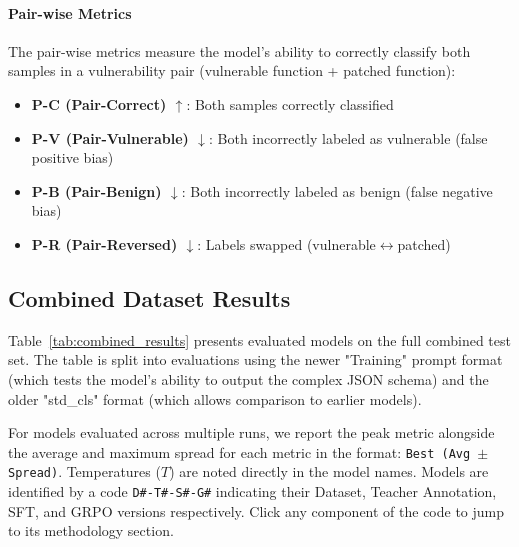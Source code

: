 \documentclass[12pt,a4paper]{article}
\begin{document}
\paragraph{Pair-wise Metrics}
The pair-wise metrics measure the model's ability to correctly classify both samples in a vulnerability pair (vulnerable function + patched function):
\begin{itemize}
  \item \textbf{P-C (Pair-Correct) $\uparrow$}: Both samples correctly classified
  \item \textbf{P-V (Pair-Vulnerable) $\downarrow$}: Both incorrectly labeled as vulnerable (false positive bias)
  \item \textbf{P-B (Pair-Benign) $\downarrow$}: Both incorrectly labeled as benign (false negative bias)
  \item \textbf{P-R (Pair-Reversed) $\downarrow$}: Labels swapped (vulnerable$\leftrightarrow$patched)
\end{itemize}

\subsection{Combined Dataset Results}

Table~\ref{tab:combined_results} presents evaluated models on the full combined test set. The table is split into evaluations using the newer "Training" prompt format (which tests the model's ability to output the complex JSON schema) and the older "std\_cls" format (which allows comparison to earlier models). 

For models evaluated across multiple runs, we report the peak metric alongside the average and maximum spread for each metric in the format: \texttt{Best (Avg $\pm$ Spread)}. Temperatures ($T$) are noted directly in the model names. Models are identified by a code \texttt{D\#-T\#-S\#-G\#} indicating their Dataset, Teacher Annotation, SFT, and GRPO versions respectively. Click any component of the code to jump to its methodology section.
\end{document}
